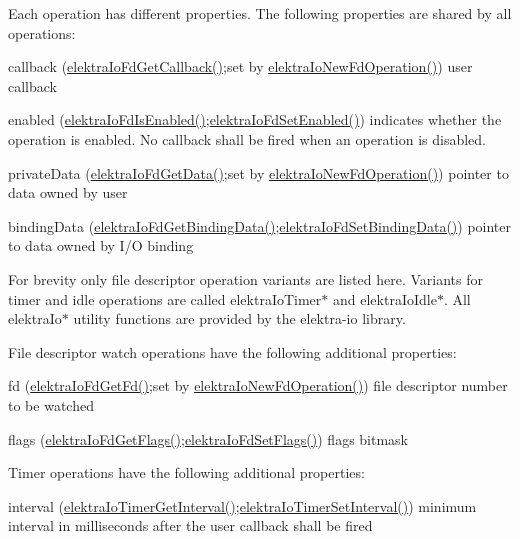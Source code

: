 Each operation has different properties. The following properties are shared by all operations\+:
\begin{DoxyItemize}
\item callback (\hyperlink{io_8c_a885381fdd55cf957af1d65db7522899a}{elektra\+Io\+Fd\+Get\+Callback()};set by \hyperlink{io_8c_a3804183da1aecdfcf09455d246c3891c}{elektra\+Io\+New\+Fd\+Operation()}) user callback
\item enabled (\hyperlink{io_8c_af35cfd8a33db0170e06cb8c3cdc08244}{elektra\+Io\+Fd\+Is\+Enabled()};\hyperlink{io_8c_a56f8b0059e6c7708681624d1994e4b44}{elektra\+Io\+Fd\+Set\+Enabled()}) indicates whether the operation is enabled. No callback shall be fired when an operation is disabled.
\item private\+Data (\hyperlink{io_8c_a6a2a281c9e437dd1d660f1310fa06108}{elektra\+Io\+Fd\+Get\+Data()};set by \hyperlink{io_8c_a3804183da1aecdfcf09455d246c3891c}{elektra\+Io\+New\+Fd\+Operation()}) pointer to data owned by user
\item binding\+Data (\hyperlink{io_8c_a6103b457ed1440d0490acf0a6ec17386}{elektra\+Io\+Fd\+Get\+Binding\+Data()};\hyperlink{io_8c_ae02ec122aafa67b7dd92d9c3daa6499e}{elektra\+Io\+Fd\+Set\+Binding\+Data()}) pointer to data owned by I/O binding
\end{DoxyItemize}

For brevity only file descriptor operation variants are listed here. Variants for timer and idle operations are called {\ttfamily elektra\+Io\+Timer$\ast$} and {\ttfamily elektra\+Io\+Idle$\ast$}. All {\ttfamily elektra\+Io$\ast$} utility functions are provided by the {\ttfamily elektra-\/io} library.

File descriptor watch operations have the following additional properties\+:
\begin{DoxyItemize}
\item fd (\hyperlink{io_8c_a7dec6afadd09f6350f9ad642906fc88a}{elektra\+Io\+Fd\+Get\+Fd()};set by \hyperlink{io_8c_a3804183da1aecdfcf09455d246c3891c}{elektra\+Io\+New\+Fd\+Operation()}) file descriptor number to be watched
\item flags (\hyperlink{io_8c_a8e2d356be0d89af3e46ebc8ce675db37}{elektra\+Io\+Fd\+Get\+Flags()};\hyperlink{io_8c_a1fd34686b0b3b1db5f460ea8c40ba5a8}{elektra\+Io\+Fd\+Set\+Flags()}) flags bitmask
\end{DoxyItemize}

Timer operations have the following additional properties\+:
\begin{DoxyItemize}
\item interval (\hyperlink{io_8c_abc383110a8cb712a0a35b958b4e446ea}{elektra\+Io\+Timer\+Get\+Interval()};\hyperlink{io_8c_a3e317e4c6e5869f296261c24312507ed}{elektra\+Io\+Timer\+Set\+Interval()}) minimum interval in milliseconds after the user callback shall be fired
\end{DoxyItemize}


